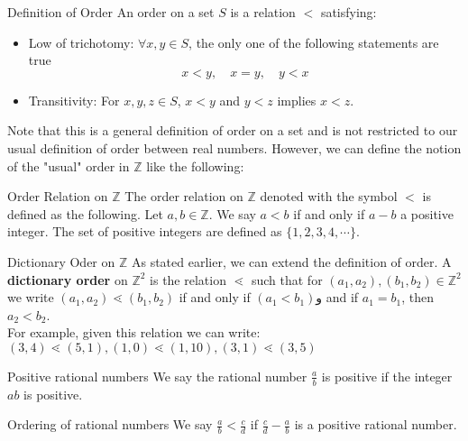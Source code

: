 \begin{defbox}{Definition of Order}
	An order on a set $ S $ is a relation $ < $ satisfying:
	\begin{itemize}
		\item Low of trichotomy: $ \forall x,y \in S $, the only one of the following statements are true
		\[ x<y, \quad x=y, \quad y<x \]
		
		\item Transitivity: For $ x,y,z \in S $, $ x<y $ and $ y<z $ implies $ x<z $.
	\end{itemize}
\end{defbox}


Note that this is a general definition of order on a set and is not restricted to our usual definition of order between real numbers. However, we can define the notion of the "usual" order in $ \mathbb{Z} $ like the following:

\begin{defbox}{Order Relation on $ \mathbb{Z} $}
	The order relation on $ \mathbb{Z} $ denoted with the symbol $ < $ is defined as the following. Let $ a,b \in \mathbb{Z} $. We say $ a<b $ if and only if $ a-b $ a positive integer. The set of positive integers are defined as $ \{ 1,2,3,4,\cdots \} $.
\end{defbox}

\begin{example}{Dictionary Oder on $\mathbb{Z}$}
	As stated earlier, we can extend the definition of order. A \textbf{dictionary order} on $\mathbb{Z}^2$ is the relation $\lessdot$ such that for $(a_1, a_2), (b_1,b_2) \in \mathbb{Z}^2$ we write $(a_1, a_2) \lessdot (b_1, b_2)$ if and only if  $(a_1 < b_1) $و and if $a_1 = b_1$, then $ a_2 < b_2 $. \\
	For example, given this relation we can write:
	$(3,4) \lessdot (5,1), (1,0) \lessdot (1,10), (3,1) \lessdot (3,5)$
\end{example}



\begin{defbox}{Positive rational numbers}
	We say the rational number $ \frac{a}{b} $ is positive if the integer $ ab $ is positive. 
\end{defbox}

\begin{defbox}{Ordering of rational numbers}
	We say $ \frac{a}{b} < \frac{c}{d}$ if $ \frac{c}{d} - \frac{a}{b} $ is a positive rational number.
\end{defbox}

